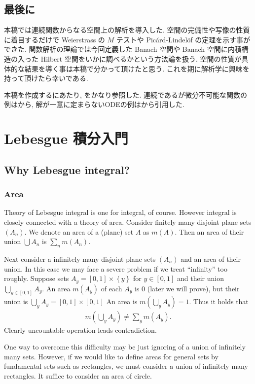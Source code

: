 \documentclass[openany, a4paper, oneside]{jsbook}
\theoremstyle{break}
\theoremstyle{breakdefn}
\newcommand{\rbk}[1]{\left (#1\right)}
\newcommand{\sqbk}[1]{\left[#1\right]}
\newcommand{\cbk}[1]{\left\{#1\right\}}
\begin{document}
\section{最後に}


本稿では連続関数からなる空間上の解析を導入した.
空間の完備性や写像の性質に着目するだけで Weierstrass の $M$ テストや Pic\'ard-Lindel\"of の定理を示す事ができた.
関数解析の理論では今回定義した Banach 空間や Banach 空間に内積構造の入った Hilbert 空間をいかに調べるかという方法論を扱う.
空間の性質が具体的な結果を導く事は本稿で分かって頂けたと思う.
これを期に解析学に興味を持って頂けたら幸いである.

本稿を作成するにあたり, \cite{JurgenJost1}をかなり参照した.
連続であるが微分不可能な関数の例は\cite{WilliamDunham1}から,
解が一意に定まらないODEの例は\cite{YoichiroTakahashi1}から引用した.
\chapter{Lebesgue 積分入門}

\section{Why Lebesgue integral?}

\subsection{Area}


Theory of Lebesgue integral is one for integral, of course.
However integral is closely connected with a theory of area.
Consider finitely many disjoint plane sets $(A_n)$.
We denote an area of a (plane) set $A$ as $m (A)$.
Then an area of their union $\bigcup A_n$ is $\sum_n m (A_n)$.

Next consider a infinitely many disjoint plane sets $(A_n)$ and an area of their union.
In this case we may face a severe problem if we treat ``infinity'' too roughly.
Suppose sets $A_y = \sqbk{0, 1} \times \cbk{y}$ for $y \in \sqbk{0, 1}$
and their union $\bigcup_{y \in \sqbk{0, 1}} A_y$.
An area $m (A_y)$ of each $A_y$ is 0 (later we will prove), but their union is $\bigcup_y A_y = \sqbk{0, 1} \times \sqbk{0, 1}$
An area is $m (\bigcup_y A_y) = 1$.
Thus it holds that
\begin{align}
 m \rbk{ \bigcup_y A_y}
 \neq
 \sum_y m (A_y).
\end{align}
Clearly uncountable operation leads contradiction.

One way to overcome this difficulty may be just ignoring of a union of infinitely many sets.
However, if we would like to define areas for general sets by fundamental sets such as rectangles,
we must consider a union of infinitely many rectangles.
It suffice to consider an area of circle.
\end{document}
